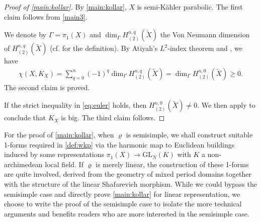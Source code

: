 \documentclass[11pt,a4paper,english]{smfart}
\theoremstyle{plain}
\theoremstyle{definition}
\theoremstyle{plain}
\newcommand\GL{\mathrm{GL}}
\begin{document}
	\begin{proof}[Proof of \cref{main:kollar}]
		By \cref{main:kollar}, $X$ is semi-K\"ahler parabolic. 	The first claim follows from \cref{main3}.	
		
		We denote by $\Gamma=\pi_1(X)$ and $\dim_{\Gamma}H^{n,q}_{(2)}(\widetilde{X})$ the Von Neumann dimension of $H^{n,q}_{(2)}(\widetilde{X})$ (cf. \cite{Ati76} for the definition). 
		By Atiyah's $L^2$-index theorem  and , we have
		\begin{align} 	\chi(X,K_X)=\sum_{q=0}^{n}(-1)^q\dim_{\Gamma}H^{n,q}_{(2)}(\widetilde{X})= \dim_{\Gamma}H^{n,0}_{(2)}(\widetilde{X})\geq 0.
		\end{align} 
 The second claim is proved. 
	
		
		If the strict  inequality in \eqref{eq:euler} holds, then $H^{n,0}_{(2)}(\widetilde{X})\neq 0$. We then apply \cite[Corollary 13.10]{Kol95} to conclude that $K_X$ is big. The third claim follows. 
	\end{proof} 
	For the proof of \cref{main:kollar}, when $\varrho$ is semisimple, 	we shall construct  suitable  1-forms required in \cref{def:wkp} via the harmonic map to Euclidean buildings induced by some representations $\pi_1(X)\to \GL_N(K)$ with $K$ a non-archimedean local field. %
	If $\varrho$ is merely linear, the construction of these 1-forms are quite involved, derived from the geometry of mixed period domains together with the structure of  the linear Shafarevich morphism.  While we could bypass the semisimple case and directly prove \cref{main:kollar} for linear representation, we choose to write the proof of the semisimple case to isolate the more technical arguments and benefits readers who are more interested in the semisimple case.  
	\fi
	
\end{document}
